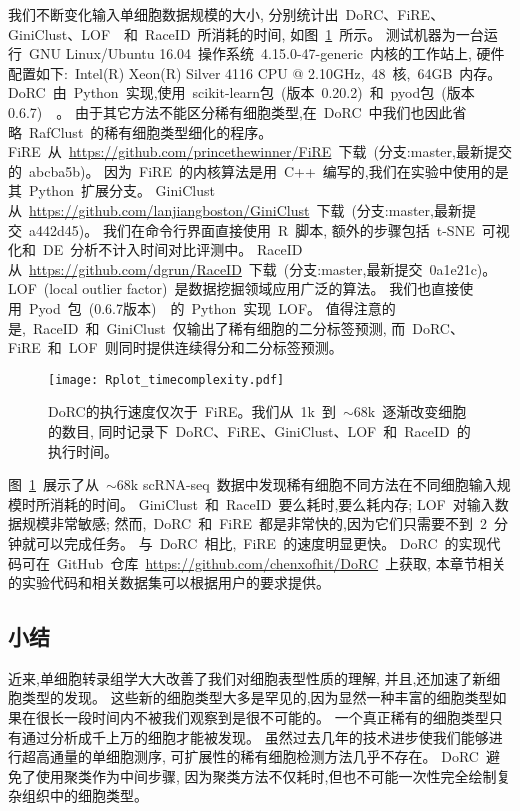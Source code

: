 我们不断变化输入单细胞数据规模的大小,
分别统计出~DoRC、FiRE、GiniClust、LOF~\cite{breunig2000lof}~和~RaceID~所消耗的时间,
如图~\ref{fig:timecomplexity}~所示。
测试机器为一台运行~GNU Linux/Ubuntu 16.04~操作系统~4.15.0-47-generic~内核的工作站上,
硬件配置如下:~Intel(R) Xeon(R) Silver 4116 CPU @ 2.10GHz,~48~核,~64GB~内存。
DoRC~由~Python~实现,使用~scikit-learn包~(版本~0.20.2)~\cite{pedregosa2011scikit}和~pyod包~(版本0.6.7)~~\cite{zhao2019pyod}。
由于其它方法不能区分稀有细胞类型,在~DoRC~中我们也因此省略~RafClust~的稀有细胞类型细化的程序。
FiRE~从~\url{https://github.com/princethewinner/FiRE}~下载~(分支:master,最新提交的~abcba5b)。
因为~FiRE~的内核算法是用~C++~编写的,我们在实验中使用的是其~Python~扩展分支。
GiniClust从~\url{https://github.com/lanjiangboston/GiniClust}~下载~(分支:master,最新提交~a442d45)。
我们在命令行界面直接使用~R~脚本,
额外的步骤包括~t-SNE~可视化和~DE~分析不计入时间对比评测中。
RaceID从~\url{https://github.com/dgrun/RaceID}~下载~(分支:master,最新提交~0a1e21c)。
LOF~(local outlier factor)~是数据挖掘领域应用广泛的算法。
我们也直接使用~Pyod~包~(0.6.7版本)~\cite{zhao2019pyod}~的~Python~实现~LOF。
值得注意的是,~RaceID~和~GiniClust~仅输出了稀有细胞的二分标签预测,
而~DoRC、FiRE~和~LOF~则同时提供连续得分和二分标签预测。
\begin{figure}[!htbp]
    \centering
    \texttt{[image: Rplot\_timecomplexity.pdf]}
    \caption{
    DoRC的执行速度仅次于~FiRE。我们从~1k~到~${\sim} 68$k~逐渐改变细胞的数目, 同时记录下~DoRC、FiRE、GiniClust、LOF~和~RaceID~的执行时间。    
    }
    \label{fig:timecomplexity}
\end{figure}
图~\ref{fig:timecomplexity}~展示了从~${\sim}68$k scRNA-seq~数据中发现稀有细胞不同方法在不同细胞输入规模时所消耗的时间。 
GiniClust~和~RaceID~要么耗时,要么耗内存;
LOF~对输入数据规模非常敏感;
然而,~DoRC~和~FiRE~都是非常快的,因为它们只需要不到~2~分钟就可以完成任务。
与~DoRC~相比,~FiRE~的速度明显更快。
DoRC~的实现代码可在~GitHub~仓库~\url{https://github.com/chenxofhit/DoRC}~上获取,
本章节相关的实验代码和相关数据集可以根据用户的要求提供。

\subsection{小结}
近来,单细胞转录组学大大改善了我们对细胞表型性质的理解,
并且,还加速了新细胞类型的发现。
这些新的细胞类型大多是罕见的,因为显然一种丰富的细胞类型如果在很长一段时间内不被我们观察到是很不可能的。
一个真正稀有的细胞类型只有通过分析成千上万的细胞才能被发现。
虽然过去几年的技术进步使我们能够进行超高通量的单细胞测序,
可扩展性的稀有细胞检测方法几乎不存在。
DoRC~避免了使用聚类作为中间步骤,
因为聚类方法不仅耗时,但也不可能一次性完全绘制复杂组织中的细胞类型。

